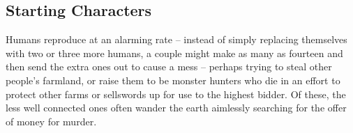 \begin{multicols}{2}
\subsection{Starting Characters}

Humans reproduce at an alarming rate -- instead of simply replacing themselves with two or three more humans, a couple might make as many as fourteen and then send the extra ones out to cause a mess -- perhaps trying to steal other people's farmland, or raise them to be monster hunters who die in an effort to protect other farms or sellswords up for use to the highest bidder.
Of these, the less well connected ones often wander the earth aimlessly searching for the offer of money for murder.

\end{multicols}

